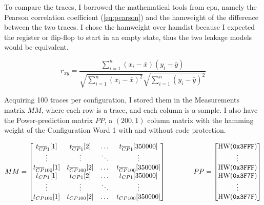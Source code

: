 \documentclass[a4paper,english,twoside,10pt]{article}
\begin{document}
To compare the traces, I borrowed the mathematical tools from \gls{cpa}, namely the Pearson correlation coefficient (\autoref{eq:pearson}) and the \gls{hamweight} of the difference between the two traces. I chose the \gls{hamweight} over \gls{hamdist} because I expected the register or flip-flop to start in an empty state, thus the two leakage models would be equivalent.

\begin{equation}\label{eq:pearson}
	r_{xy} =\frac{\sum ^n _{i=1}(x_i - \bar{x})(y_i - \bar{y})}{\sqrt{\sum ^n _{i=1}(x_i - \bar{x})^2} \sqrt{\sum ^n _{i=1}(y_i - \bar{y})^2}}
\end{equation}

Acquiring 100 traces per configuration, I stored them in the Measurements matrix \(MM\), where each row is a trace, and each column is a sample. I also have the Power-prediction matrix \(PP\), a \((200, 1)\) column matrix with the hamming weight of the Configuration Word 1 with and without code protection.

\[
MM = 
\begin{bmatrix}
	t_{\overline{\footnotesize CP}1}[1] & t_{\overline{\footnotesize CP}1}[2] & \dots & t_{\overline{\footnotesize CP}1}[350000] \\
	\vdots & \vdots & \ddots & \vdots \\
	t_{\overline{\footnotesize CP}100}[1] & t_{\overline{\footnotesize CP}100}[2] & \dots & t_{\overline{\footnotesize CP}100}[350000] \\
	t_{\footnotesize CP1}[1] & t_{\footnotesize CP1}[2] & \dots & t_{\footnotesize CP1}[350000] \\
	\vdots & \vdots & \ddots & \vdots \\
	t_{\footnotesize CP100}[1] & t_{\footnotesize CP100}[2] & \dots & t_{\footnotesize CP100}[350000]
\end{bmatrix}
\qquad \qquad
PP =
\begin{bmatrix}
	\text{HW}(\mbox{\texttt{0x3FFF}}) \\
	\vdots \\
	\text{HW}(\mbox{\texttt{0x3FFF}}) \\
	\text{HW}(\mbox{\texttt{0x3F7F}}) \\
	\vdots \\
	\text{HW}(\mbox{\texttt{0x3F7F}})
\end{bmatrix}
\]
\end{document}
